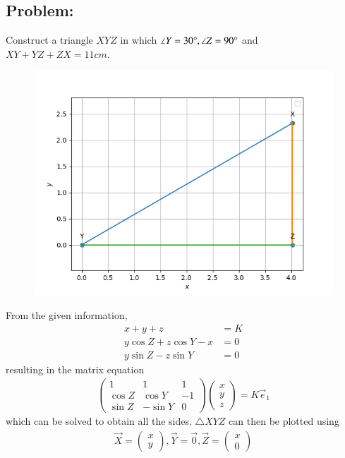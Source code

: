 \documentclass[10pt,a4paper]{report}
\newcommand{\myvec}[1]{\ensuremath{\begin{pmatrix}#1\end{pmatrix}}}
\begin{document}
\begin{multicols}{2}

\section{Problem:}  
\fi
Construct a triangle $XYZ$ in which $\angle{Y}=30\degree, \angle{Z}=90\degree$ and  $XY+YZ+ZX=11cm$.
	\begin{figure}[!h]
		\centering
 \includegraphics[width=\columnwidth]{chapters/9/11/2/4/figs/line.png}
		\caption{}
		\label{fig:9/11/2/4}
  	\end{figure}
	\solution From the given information, 
\begin{align}
	x+y+z &= K
	\\
	y\cos Z + z \cos Y -x &=0
	\\
	y\sin Z - z \sin Y &=0
\end{align}
resulting in the matrix equation
\begin{align}
	\myvec{
		1 & 1 & 1 
	\\
	\cos Z &  \cos Y &-1
	\\
	\sin Z &-  \sin Y & 0
}\myvec{x \\ y \\ z}
= K \vec{e}_1
\end{align}
which can be solved to obtain all the sides.  $\triangle XYZ$ can then be plotted using
\begin{align}
	\vec{X} = \myvec{x \\ y},
	\vec{Y} = \vec{0},
	\vec{Z} =\myvec{x \\ 0}
\end{align}
	\iffalse


\end{multicols}
\end{document}
